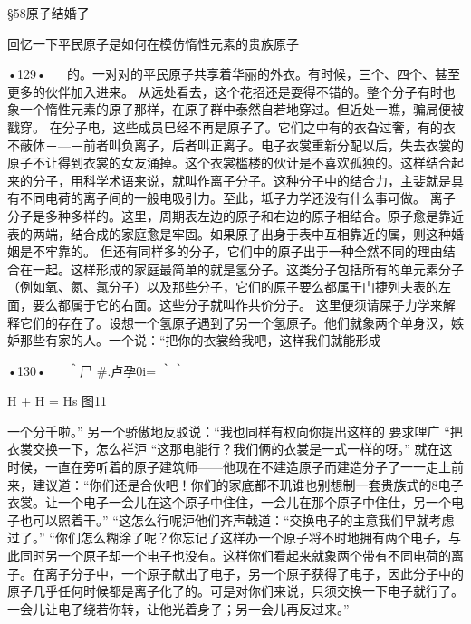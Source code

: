 §58原子结婚了

回忆一下平民原子是如何在模仿惰性元素的贵族原子

•129•
  
的。一对对的平民原子共享着华丽的外衣。有时候，三个、四个、甚至更多的伙伴加入进来。
从远处看去，这个花招还是耍得不错的。整个分子有时也象一个惰性元素的原子那样，在原子群中泰然自若地穿过。但近处一瞧，骗局便被戳穿。
在分子电，这些成员巳经不再是原子了。它们之中有的衣旮过奢，有的衣不蔽体－—－前者叫负离子，后者叫正离子。电子衣裳重新分配以后，失去衣裳的原子不让得到衣裳的女友涌掉。这个衣裳槛楼的伙计是不喜欢孤独的。这样结合起来的分子，用科学术语来说，就叫作离子分子。这种分子中的结合力，主婓就是具有不同电荷的离子间的一般电吸引力。至此，坻子力学还没有什么事可做。
离子分子是多种多样的。这里，周期表左边的原子和右边的原子相结合。原子愈是靠近表的两端，结合成的家庭愈是牢固。如果原子出身于表中互相靠近的属，则这种婚姻是不牢靠的。
但还有同样多的分子，它们中的原子出于一种全然不同的理由结合在一起。这样形成的家庭最简单的就是氢分子。这类分子包括所有的单元素分子（例如氧、氮、氯分子）以及那些分子，它们的原子要么都属于门捷列夫表的左面，要么都属于它的右面。这些分子就叫作共价分子。
这里便须请屎子力学来解释它们的存在了。设想一个氢原子遇到了另一个氢原子。他们就象两个单身汉，嫉妒那些有家的人。一个说：“把你的衣裳给我吧，这样我们就能形成

•130•
  
＾尸
#.卢孕0i=
｀｀
 
 

 
	H	+	H	=	Hs
图11

一个分千啦。”
另一个骄傲地反驳说：“我也同样有权向你提出这样的
要求哩广
“把衣裳交换一下，怎么祥沪
“这那电能行？我们俩的衣裳是一式一样的呀。”
就在这时候，一直在旁听着的原子建筑师——他现在不建造原子而建造分子了一一走上前来，建议道：“你们还是合伙吧！你们的家底都不玑谁也别想制一套贵族式的8电子衣裳。让一个电子一会儿在这个原子中住住，一会儿在那个原子中住仕，另一个电子也可以照着干。”
“这怎么行呢沪他们齐声戟道：“交换电子的主意我们早就考虑过了。”
“你们怎么糊涂了呢？你忘记了这样办一个原子将不时地拥有两个电子，与此同时另一个原子却一个电子也没有。这样你们看起来就象两个带有不同电荷的离子。在离子分子中，一个原子献出了电子，另一个原子获得了电子，因此分子中的原子几乎任何时候都是离子化了的。可是对你们来说，只须交换一下电子就行了。一会儿让电子绕若你转，让他光着身子；另一会儿再反过来。”

